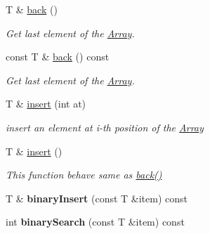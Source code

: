 \begin{DoxyCompactItemize}
T \& \hyperlink{class_magnum_1_1_array_a2326e6c7eb57ba2a3f147f7b0232d3ac}{back} ()
\begin{DoxyCompactList}\small\item\em Get last element of the \hyperlink{class_magnum_1_1_array}{Array}. \end{DoxyCompactList}\item 
const T \& \hyperlink{class_magnum_1_1_array_a3b3da1d95d58489569031fb3ea68a532}{back} () const 
\begin{DoxyCompactList}\small\item\em Get last element of the \hyperlink{class_magnum_1_1_array}{Array}. \end{DoxyCompactList}\item 
T \& \hyperlink{class_magnum_1_1_array_a25101c6a61ed527295f4ac881aaa430d}{insert} (int at)
\begin{DoxyCompactList}\small\item\em insert an element at i-\/th position of the \hyperlink{class_magnum_1_1_array}{Array} \end{DoxyCompactList}\item 
T \& \hyperlink{class_magnum_1_1_array_ad60beb01c2fff1bb8bc2b8a0fdfa21e8}{insert} ()
\begin{DoxyCompactList}\small\item\em This function behave same as \hyperlink{class_magnum_1_1_array_a2326e6c7eb57ba2a3f147f7b0232d3ac}{back()} \end{DoxyCompactList}\item 
T \& {\bfseries binary\+Insert} (const T \&item) const \hypertarget{class_magnum_1_1_array_a33dabae65ae538bdc0c3427e2757f2f9}{}\label{class_magnum_1_1_array_a33dabae65ae538bdc0c3427e2757f2f9}

\item 
int {\bfseries binary\+Search} (const T \&item) const \hypertarget{class_magnum_1_1_array_a149970c2c88a9ffb2d20b7a2c1b64a76}{}\label{class_magnum_1_1_array_a149970c2c88a9ffb2d20b7a2c1b64a76}


\end{DoxyCompactItemize}
